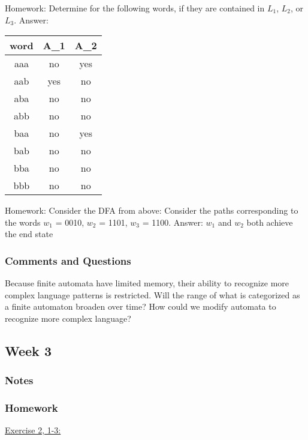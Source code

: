 \documentclass{article}
\theoremstyle{theorem}
\theoremstyle{definition}
\theoremstyle{remark}
\begin{document}
Homework: Determine for the following words, if they are contained in $L_{1}$, $L_{2}$, or $L_{3}$.\newline
Answer:
\begin{table}[h!]
  \centering
  \begin{tabular}{||c c c||} 
   \hline
   word & A\_1 & A\_2 \\ [0.5ex] 
   \hline\hline
   aaa & no  & yes  \\ 
   aab & yes  & no  \\
   aba & no  & no  \\
   abb & no  & no  \\
   baa & no  & yes \\ 
   bab & no & no \\
   bba & no & no \\
   bbb & no & no \\ [1ex] 
   \hline
  \end{tabular}
  \end{table}

Homework: Consider the DFA from above: Consider the paths corresponding to the words $w_{1}$ = 0010, $w_{2}$ = 1101, $w_{3}$ = 1100.\newline
Answer: $w_{1}$ and $w_{2}$ both achieve the end state

\subsubsection*{Comments and Questions}
Because finite automata have limited memory, their ability to recognize more complex language patterns is restricted. Will the range of what is categorized as a finite automaton broaden over time? How could we modify automata to recognize more complex language?


\subsection{Week 3}

\subsubsection*{Notes}

\subsubsection*{Homework}

\underline{Exercise 2, 1-3:}
\end{document}
